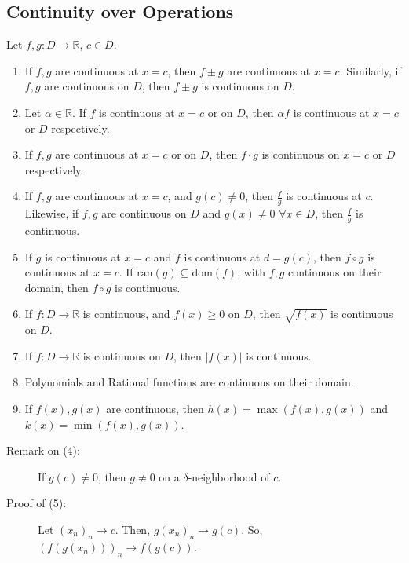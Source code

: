 \documentclass[10pt]{extarticle}
\newcommand{\R}{\mathbb{R}}
\begin{document}
  \subsection{Continuity over Operations}%
    Let $f,g: D\rightarrow \R$, $c\in D$.
    \begin{enumerate}[(1)]
      \item If $f,g$ are continuous at $x = c$, then $f\pm g$ are continuous at $x=c$. Similarly, if $f,g$ are continuous on $D$, then $f\pm g$ is continuous on $D$.
      \item Let $\alpha \in \R$. If $f$ is continuous at $x=c$ or on $D$, then $\alpha f$ is continuous at $x=c$ or $D$ respectively.
      \item If $f,g$ are continuous at $x=c$ or on $D$, then $f\cdot g$ is continuous on $x=c$ or $D$ respectively.
      \item If $f,g$ are continuous at $x=c$, and $g(c) \neq 0$, then $\frac{f}{g}$ is continuous at $c$. Likewise, if $f,g$ are continuous on $D$ and $g(x)\neq 0$ $\forall x\in D$, then $\frac{f}{g}$ is continuous.
      \item If $g$ is continuous at $x=c$ and $f$ is continuous at $d=g(c)$, then $f\circ g$ is continuous at $x=c$. If $\text{ran}(g) \subseteq \text{dom}(f)$, with $f,g$ continuous on their domain, then $f\circ g$ is continuous.
      \item If $f: D\rightarrow \R$ is continuous, and $f(x) \geq 0$ on $D$, then $\sqrt{f(x)}$ is continuous on $D$.
      \item If $f: D\rightarrow \R$ is continuous on $D$, then $|f(x)|$ is continuous.
      \item Polynomials and Rational functions are continuous on their domain.
      \item If $f(x),g(x)$ are continuous, then $h(x) = \max(f(x),g(x))$ and $k(x) = \min(f(x),g(x))$.
    \end{enumerate}
    \begin{description}
      \item[Remark on (4):] If $g(c) \neq 0$, then $g\neq 0$ on a $\delta$-neighborhood of $c$.
      \item[Proof of (5):] Let $(x_n)_n \rightarrow c$. Then, $g(x_n)_n \rightarrow g(c)$. So, $(f(g(x_n)))_n \rightarrow f(g(c))$.
    \end{description}
\end{document}
